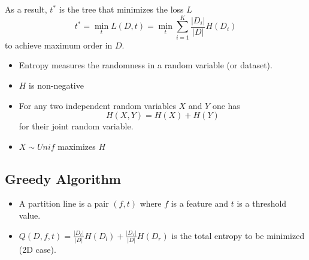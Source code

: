 As a result, $t^*$ is the tree that minimizes the loss $L$
\noindent\begin{equation*}
    t^* = \min_t L(D,t) =\min_t \sum_{i=1}^{K} \frac{|D_i|}{|D|}H(D_i)
\end{equation*}
to achieve maximum order in $D$.


\begin{itemize}
    \item Entropy measures the randomness in a random variable (or dataset).
    \item $H$ is non-negative
    \item For any two independent random variables $X$ and $Y$ one has
          \begin{equation*}
              H(X,Y)=H(X)+H(Y)
          \end{equation*} for their joint random variable.
    \item $X\sim Unif$ maximizes $H$
\end{itemize}

\subsection{Greedy Algorithm}


\begin{itemize}
    \item A partition line is a pair $(f,t)$ where $f$ is a feature and $t$ is a threshold value.
    \item $Q(D,f,t)=\frac{|D_\ell|}{|D|}H(D_l)+\frac{|D_r|}{|D|}H(D_r)$ is the total entropy to be minimized (2D case).
\end{itemize}